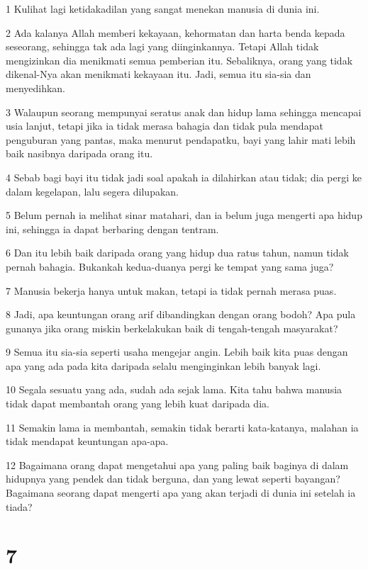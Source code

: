 \par 1 Kulihat lagi ketidakadilan yang sangat menekan manusia di dunia ini.
\par 2 Ada kalanya Allah memberi kekayaan, kehormatan dan harta benda kepada seseorang, sehingga tak ada lagi yang diinginkannya. Tetapi Allah tidak mengizinkan dia menikmati semua pemberian itu. Sebaliknya, orang yang tidak dikenal-Nya akan menikmati kekayaan itu. Jadi, semua itu sia-sia dan menyedihkan.
\par 3 Walaupun seorang mempunyai seratus anak dan hidup lama sehingga mencapai usia lanjut, tetapi jika ia tidak merasa bahagia dan tidak pula mendapat penguburan yang pantas, maka menurut pendapatku, bayi yang lahir mati lebih baik nasibnya daripada orang itu.
\par 4 Sebab bagi bayi itu tidak jadi soal apakah ia dilahirkan atau tidak; dia pergi ke dalam kegelapan, lalu segera dilupakan.
\par 5 Belum pernah ia melihat sinar matahari, dan ia belum juga mengerti apa hidup ini, sehingga ia dapat berbaring dengan tentram.
\par 6 Dan itu lebih baik daripada orang yang hidup dua ratus tahun, namun tidak pernah bahagia. Bukankah kedua-duanya pergi ke tempat yang sama juga?
\par 7 Manusia bekerja hanya untuk makan, tetapi ia tidak pernah merasa puas.
\par 8 Jadi, apa keuntungan orang arif dibandingkan dengan orang bodoh? Apa pula gunanya jika orang miskin berkelakukan baik di tengah-tengah masyarakat?
\par 9 Semua itu sia-sia seperti usaha mengejar angin. Lebih baik kita puas dengan apa yang ada pada kita daripada selalu menginginkan lebih banyak lagi.
\par 10 Segala sesuatu yang ada, sudah ada sejak lama. Kita tahu bahwa manusia tidak dapat membantah orang yang lebih kuat daripada dia.
\par 11 Semakin lama ia membantah, semakin tidak berarti kata-katanya, malahan ia tidak mendapat keuntungan apa-apa.
\par 12 Bagaimana orang dapat mengetahui apa yang paling baik baginya di dalam hidupnya yang pendek dan tidak berguna, dan yang lewat seperti bayangan? Bagaimana seorang dapat mengerti apa yang akan terjadi di dunia ini setelah ia tiada?

\chapter{7}

